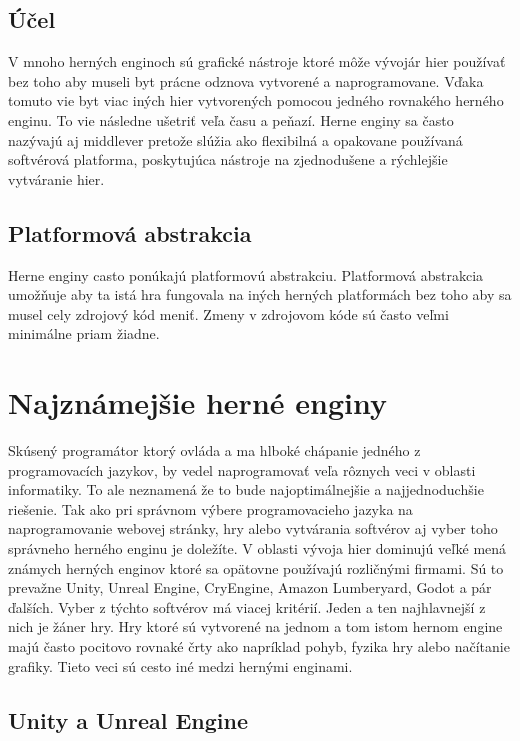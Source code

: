 \documentclass[10pt,twoside,slovak,a4paper]{article}
\begin{document}
\subsection{Účel} 

V mnoho herných enginoch sú grafické nástroje ktoré môže vývojár hier používať bez toho aby museli byt prácne odznova vytvorené a naprogramovane. Vďaka tomuto vie byt viac iných hier vytvorených pomocou jedného rovnakého herného enginu. To vie následne ušetriť veľa času a peňazí. Herne enginy sa často nazývajú aj middlever pretože slúžia ako flexibilná a opakovane používaná softvérová platforma, poskytujúca nástroje na zjednodušene a rýchlejšie vytváranie hier. 

\subsection{Platformová abstrakcia} 

Herne enginy casto ponúkajú platformovú abstrakciu. Platformová abstrakcia umožňuje aby ta istá hra fungovala na iných herných platformách bez toho aby sa musel cely zdrojový kód meniť. Zmeny v zdrojovom kóde sú často veľmi minimálne priam žiadne.

\section{Najznámejšie herné enginy}

Skúsený programátor ktorý ovláda a ma hlboké chápanie jedného z programovacích jazykov, by vedel naprogramovať veľa rôznych veci v oblasti informatiky. To ale neznamená že to bude najoptimálnejšie a najjednoduchšie riešenie. Tak ako pri správnom výbere programovacieho jazyka na naprogramovanie webovej stránky, hry alebo vytvárania softvérov aj vyber toho správneho herného enginu je doležíte. V oblasti vývoja hier dominujú veľké mená známych herných enginov ktoré sa opätovne používajú rozličnými firmami. Sú to prevažne Unity, Unreal Engine, CryEngine, Amazon Lumberyard, Godot a pár ďalších. Vyber z týchto softvérov má viacej kritérií. Jeden a ten najhlavnejší z nich je žáner hry. Hry ktoré sú vytvorené na jednom a tom istom hernom engine majú často pocitovo rovnaké črty ako napríklad pohyb, fyzika hry alebo načítanie grafiky. Tieto veci sú cesto iné medzi hernými enginami. 
\cite{zname-enginy}

\subsection{Unity a Unreal Engine} 
\end{document}

